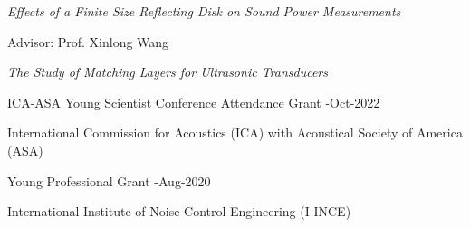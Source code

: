 \documentclass[10pt,a4paper,ragged2e,withhyper]{altacv}
\begin{document}
\faBook \textit{Effects of a Finite Size Reflecting Disk on Sound Power Measurements}

\divider


\faUserTie Advisor: Prof. Xinlong Wang\href{https://orcid.org/0000-0002-8137-1692}{\color{accent}\faOrcid}

\faBook \textit{The Study of Matching Layers for Ultrasonic Transducers}


\medskip















{\color{accent}ICA-ASA Young Scientist Conference Attendance Grant} 
\hfill {}-Oct-2022
\par
International Commission for
Acoustics (ICA) with Acoustical Society of America (ASA)

\divider

{\color{accent}Young Professional Grant}
\hfill {}-Aug-2020
\par
International Institute of Noise Control Engineering (I-INCE)
\end{document}
